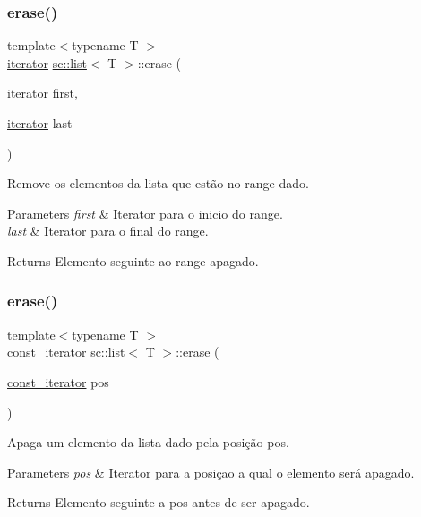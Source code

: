 \subsubsection{\texorpdfstring{erase()}{erase()}\hspace{0.1cm}{\footnotesize\ttfamily [2/4]}}
{\footnotesize\ttfamily template$<$typename T $>$ \\
\hyperlink{classsc_1_1list_1_1iterator}{iterator} \hyperlink{classsc_1_1list}{sc\+::list}$<$ T $>$\+::erase (\begin{DoxyParamCaption}\item[{\hyperlink{classsc_1_1list_1_1iterator}{iterator}}]{first,  }\item[{\hyperlink{classsc_1_1list_1_1iterator}{iterator}}]{last }\end{DoxyParamCaption})\hspace{0.3cm}{\ttfamily [inline]}}

Remove os elementos da lista que estão no range dado. 
\begin{DoxyParams}{Parameters}
{\em first} & Iterator para o inicio do range. \\
\hline
{\em last} & Iterator para o final do range. \\
\hline
\end{DoxyParams}
\begin{DoxyReturn}{Returns}
Elemento seguinte ao range apagado. 
\end{DoxyReturn}
\mbox{\label{classsc_1_1list_a3ae9390d6ebdea866b9e4b934d072eac}} 
\subsubsection{\texorpdfstring{erase()}{erase()}\hspace{0.1cm}{\footnotesize\ttfamily [3/4]}}
{\footnotesize\ttfamily template$<$typename T $>$ \\
\hyperlink{classsc_1_1list_1_1const__iterator}{const\+\_\+iterator} \hyperlink{classsc_1_1list}{sc\+::list}$<$ T $>$\+::erase (\begin{DoxyParamCaption}\item[{\hyperlink{classsc_1_1list_1_1const__iterator}{const\+\_\+iterator}}]{pos }\end{DoxyParamCaption})\hspace{0.3cm}{\ttfamily [inline]}}

Apaga um elemento da lista dado pela posição pos. 
\begin{DoxyParams}{Parameters}
{\em pos} & Iterator para a posiçao a qual o elemento será apagado. \\
\hline
\end{DoxyParams}
\begin{DoxyReturn}{Returns}
Elemento seguinte a pos antes de ser apagado. 
\end{DoxyReturn}
\mbox{\label{classsc_1_1list_a2b2b7556fbd15d54094713647750de03}} 
